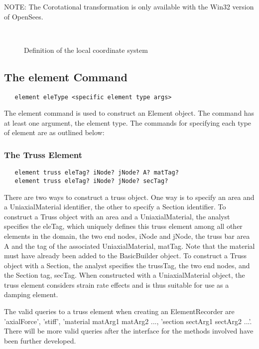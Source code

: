 \documentclass[12pt]{article}
\begin{document}
NOTE: The Corotational transformation is only available with the Win32 version
of OpenSees.

\begin{figure}[htpb]
\begin{center}
\leavevmode
\hbox{%
}
\end{center}
\caption{Definition of the local coordinate system}
\label{localAxis}
\end{figure}

\subsection{The element Command}
{\sf\small
\begin{verbatim}
   element eleType <specific element type args>
\end{verbatim}
}

The element command is used to construct an Element object. The
command has at least one argument, the element type. The commands for
specifying each type of element are as outlined below:  

\subsubsection{The Truss Element}
{\sf\small
\begin{verbatim}
   element truss eleTag? iNode? jNode? A? matTag?
   element truss eleTag? iNode? jNode? secTag?
\end{verbatim}
}

\noindent There are two ways to construct a truss object. One way is
to specify an area and a UniaxialMaterial identifier, the other to specify a
Section identifier. To construct a Truss object with an area and a
UniaxialMaterial, the analyst specifies the eleTag, which uniquely defines
this truss element among all other elements in the domain, the two end
nodes, iNode and jNode, the truss bar area A and the tag of the
associated UniaxialMaterial, matTag. Note that the material must have already
been added to the BasicBuilder object. To construct a Truss object
with a Section, the analyst specifies the trussTag, the two end nodes,
and the Section tag, secTag. When constructed with a UniaxialMaterial object,
the truss element considers strain rate effects and is thus suitable for
use as a damping element.

The valid queries to a truss element when creating an ElementRecorder
are 'axialForce', 'stiff', 'material matArg1 matArg2 ..., 'section sectArg1
sectArg2 ...'. There will be more valid queries after the interface
for the methods involved have been further developed.
\end{document}
